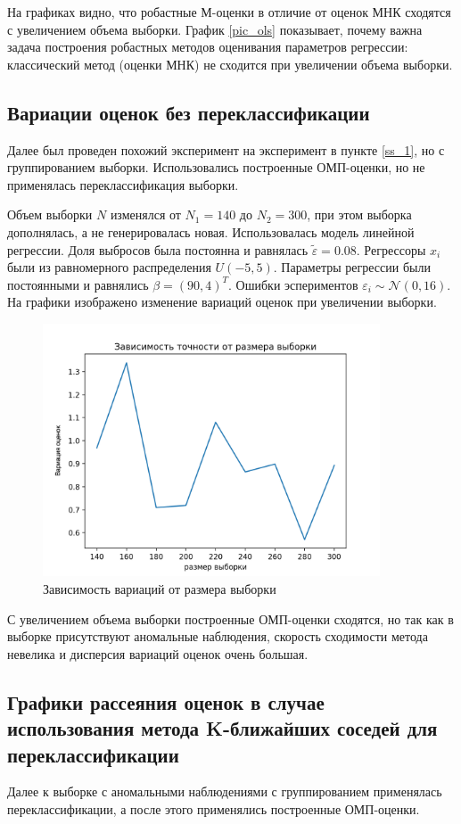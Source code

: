 На графиках видно, что робастные М-оценки в отличие от оценок МНК сходятся с увеличением объема выборки. 
График \ref{pic_ols} показывает, почему важна задача построения робастных методов оценивания параметров регрессии: классический метод (оценки МНК) не сходится при увеличении объема выборки.

\subsection{Вариации оценок без переклассификации}
Далее был проведен похожий эксперимент на эксперимент в пункте \ref{ss_1}, но с группированием выборки. Использовались построенные ОМП-оценки, но не применялась переклассификация выборки. 

Объем выборки $N$ изменялся от $N_1=140$ до $N_2=300$, при этом выборка дополнялась, а не генерировалась новая. Использовалась модель линейной регрессии. Доля выбросов была постоянна и равнялась $\widetilde{\varepsilon}=0.08$. 
Регрессоры $x_i$ были из равномерного распределения $U(-5,5)$.  Параметры регрессии были постоянными и равнялись $\beta=(90,4)^T$. Ошибки эспериментов $\varepsilon_i\sim \mathcal{N}(0,16)$.
На графики изображено изменение вариаций оценок при увеличении выборки.
\begin{figure}[hb]
    \centering
    \includegraphics[width=100mm]{../images/plot_90_4_accuracy-samplesize.png}
    \caption{Зависимость вариаций от размера выборки\label{overflow}}
    \label{pic6}
\end{figure}

С увеличением объема выборки построенные ОМП-оценки сходятся, но так как в выборке присутствуют аномальные наблюдения, скорость сходимости метода невелика и дисперсия вариаций оценок очень большая. 

\subsection{Графики рассеяния оценок в случае использования метода K-ближайших соседей для переклассификации}
Далее к выборке с аномальными наблюдениями с группированием применялась переклассификации, а после этого применялись построенные ОМП-оценки.

